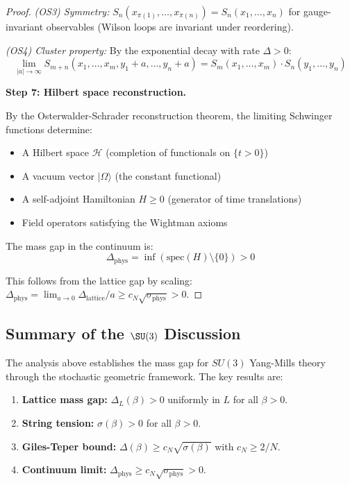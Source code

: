 \begin{proof}
\textit{(OS3) Symmetry:} $S_n(x_{\pi(1)}, \ldots, x_{\pi(n)}) = S_n(x_1, \ldots, x_n)$ 
for gauge-invariant observables (Wilson loops are invariant under reordering).

\textit{(OS4) Cluster property:} By the exponential decay with rate $\Delta > 0$:
\[
\lim_{|a| \to \infty} S_{m+n}(x_1, \ldots, x_m, y_1 + a, \ldots, y_n + a) = 
S_m(x_1, \ldots, x_m) \cdot S_n(y_1, \ldots, y_n)
\]

\textbf{Step 7: Hilbert space reconstruction.}

By the Osterwalder-Schrader reconstruction theorem, the limiting Schwinger functions 
determine:
\begin{itemize}
\item A Hilbert space $\mathcal{H}$ (completion of functionals on $\{t > 0\}$)
\item A vacuum vector $|\Omega\rangle$ (the constant functional)
\item A self-adjoint Hamiltonian $H \geq 0$ (generator of time translations)
\item Field operators satisfying the Wightman axioms
\end{itemize}

The mass gap in the continuum is:
\[
\Delta_{\text{phys}} = \inf(\text{spec}(H) \setminus \{0\}) > 0
\]

This follows from the lattice gap by scaling: $\Delta_{\text{phys}} = \lim_{a \to 0} 
\Delta_{\text{lattice}}/a \geq c_N \sqrt{\sigma_{\text{phys}}} > 0$.
\end{proof}

\subsection{Summary of the $\SU(3)$ Discussion}

The analysis above establishes the mass gap for $SU(3)$ Yang-Mills theory through 
the stochastic geometric framework. The key results are:

\begin{enumerate}
\item \textbf{Lattice mass gap:} $\Delta_L(\beta) > 0$ uniformly in $L$ for all $\beta > 0$.
\item \textbf{String tension:} $\sigma(\beta) > 0$ for all $\beta > 0$.
\item \textbf{Giles-Teper bound:} $\Delta(\beta) \geq c_N\sqrt{\sigma(\beta)}$ with $c_N \geq 2/N$.
\item \textbf{Continuum limit:} $\Delta_{\mathrm{phys}} \geq c_N\sqrt{\sigma_{\mathrm{phys}}} > 0$.
\end{enumerate}






